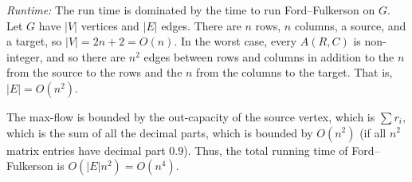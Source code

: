 \documentclass[12 pt, letterpaper]{hmcpset}
\begin{document}
\begin{solution}
	\emph{Runtime:} The run time is dominated by the time to run Ford--Fulkerson on $G$. Let $G$ have $\lvert V \rvert$ vertices and $\lvert E \rvert$ edges. There are $n$ rows, $n$ columns, a source, and a target, so $\lvert V \rvert = 2n + 2 = O(n)$. In the worst case, every $A(R, C)$ is non-integer, and so there are $n^{2}$ edges between rows and columns in addition to the $n$ from the source to the rows and the $n$ from the columns to the target. That is, $\lvert E \rvert = O(n^{2})$. 

	The max-flow is bounded by the out-capacity of the source vertex, which is $\sum r_{i}$, which is the sum of all the decimal parts, which is bounded by $O(n^{2})$ (if all $n^{2}$ matrix entries have decimal part $0.9$). Thus, the total running time of Ford--Fulkerson is $O(\lvert E \rvert n^{2}) = O(n^{4})$.
\end{solution}
\end{document}
